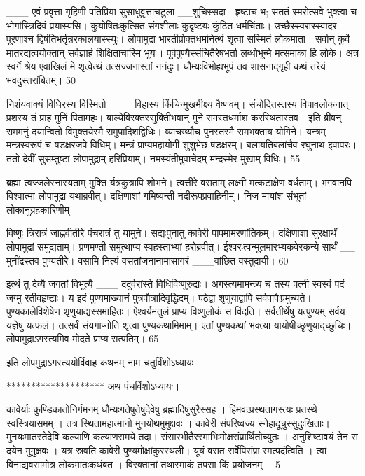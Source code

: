   ___ एवं प्रवृत्ता गृहिणी पतिप्रिया सुसाधुवृत्ताचटुला
__शुचिस्सदा।
 हृष्टाच भ; सततं स्मरोत्सवे भुक्त्वा च
भोगांस्त्रिदिवं प्रयास्यसि।
 कुयोषितःकुत्सित संगशीलाः कुदृष्टयः
कुंठित धर्मचिंताः।
 उच्छैस्स्वरास्स्वादर
पूरणाश्च द्विषंतिभर्तृन्नरकालयास्स्युः।
 लोपामुद्रा भारतीप्रोक्तधर्मानेत्थं शृत्वा
सस्मितं लोकमाता।
 सर्वान् कुर्वे मातरद्यत्वयोक्तान्
सर्वज्ञाहं शिक्षिताचास्मि भूयः।
 पूर्वपुण्यैस्संचितैरेषभर्ता लब्धोभून्मे
मत्समाका हि लोके।
 अत्र स्वर्गे श्रेय एवाखिलं मे शृत्वेत्थं
तत्सज्जनास्तां ननंदुः।
 धौम्यःविभोह्यभूपं तव शासनाद्गृही
कथं तरेयं भवदुस्तरांबितम्।
 50

  निशंयवाक्यं विधिरस्य विस्मितो
___ विहास्य किंचिन्मुखमीक्ष्य वैष्णवम्।
 संचोदितस्तस्य विपावलोकनात् प्रशस्य
तं प्राह मुनिं पितामहः।
 बाल्येविरक्तस्सुक्तिीभवान् मुने
समस्तधर्माश करस्थितास्तव।
 इति ब्रीवन् राममनुं दयान्वितो
विमुक्तयेस्मै समुपादिशद्विधिः।
 व्याचख्यौच पुनस्तस्मै रामभक्ताय योगिने।
 यन्त्रम् मन्त्रस्वरूपं च षडक्षरजपे विधिम्।
 मन्त्रं प्राप्यमहायोगी शुशुभेछ षडक्षरम्।
 बलायतिबलांचैव रघुनाथ इवापरः।
 ततो देवीं सुसम्तुष्टां लोपामुद्राम् हरिप्रियाम्।
 नमस्यंतीमुवाचेदम् मन्दस्मेर मुखाम् विधिः।
 55

 
ब्रह्मा
त्वज्जलेस्नास्यताम् मुक्ति र्यत्रकुत्रापि शोभने।
 त्वत्तीरे वसताम् लक्ष्मी मत्कटाक्षेण वर्धताम्।
 भगवानपि विश्वात्मा लोपामुद्रा यथाब्रवीत्।
 दक्षिणाशां गमिष्यन्ती नदीरूपप्रवाहिनीम्।
 निज मायांश संभूतां लोकानुग्रहकारिणीम्।
 
विष्णुः
त्रिरात्रं जाह्नवीतीरे पंचरात्रं तु यामुने।
 सद्यःपुनातु कावेरी पापमामरणांतिकम्।
 दक्षिणाशा सुरक्षार्थं लोपामुद्रां समुद्यताम्।
 प्रणमण्ती समुत्थाप्य स्वहस्ताभ्यां हरोब्रवीत्।
 ईश्वरःत्वन्मूलमारभ्यकवेरकन्ये सार्थं
__ मुनींद्रस्तव पुण्यतीरे।
 वसामि नित्यं वसतांजनानामासागरं
___वांछित वस्तुदायी।
60

 इत्थं तु देव्यै जगतां विभूत्यै
___ ददुर्वरांस्ते विधिविष्णुरुद्राः।
 अगस्त्यमामन्त्र्य च तस्य पत्नी स्वस्वं
पदं जग्मु रतीवहृष्टाः।
 य इदं पुण्यमाख्यानं पुत्रपौत्रादिवृद्धिदम्।
 पठेद्वा शृणुयाद्वापि सर्वपापैःप्रमुच्यते।
 पुण्यकालेविशेषेण शृणुयाद्यस्समाहितः।
 ऐश्वर्यमतुलं प्राप्य विष्णुलोकं स विंदति।
 सर्वतीर्थेषु यत्पुण्यम् सर्वय यज्ञेषु यत्फलं।
 तत्सर्वं संयगाप्नोति शृत्वा पुण्यकथामिमाम्।
 एतां पुण्यकथां भक्त्या यायोषीच्छृणुयाद्च्छुचिः।
 लोपामुद्राऽगस्त्यमिव मोदते प्राप्य सत्पतिम्।
 65

 
इति लोपमुद्राऽगस्त्ययोर्विवाह कथनम् नाम
चतुर्विंशोऽध्यायः।

********************
अथ पंचविंशोऽध्यायः।

कावेर्याः कुण्डिकातोनिर्गमनम् धौम्यःगतेषुतेषुदेवेषु ब्रह्मादिषुसुरैस्सह ।
 हिमवत्प्रस्थतागस्त्यः प्रतस्थे स्वस्त्रियासमम् ।
 तत्र स्थितामहात्मानो मुनयोथमुमुक्षवः ।
 कावेरी संपरिष्वज्य स्नेहादूचुस्सुदुःखिताः।
 मुनयःमातस्तेदेवि कल्याणि कल्याणसमये तदा।
 संसारभीतैरस्माभिःमोक्षसंप्रार्थितोच्युतः ।
 अनुशिष्टावयं तेन स दयेन मुमुक्षवः ।
 यत्र स्रवति कावेरी पुण्यमोक्षांकुरस्थली।
 यूयं वसत सर्वेपिसंप्रा.स्मत्पदंत्विति ।
 त्वां विनाद्यवसामोत्र लोकमातःकथंबत ।
 विरक्तानां तथास्माकं तपसा किं प्रयोजनम् ।
 5

